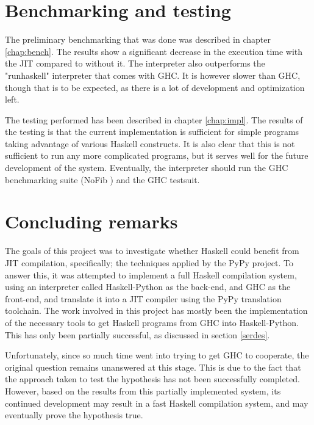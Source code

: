 \section{Benchmarking and testing}

\begin{comment}
Some simple benchmarking and testing was done. The benchmarking was done by
running the naive fibonacci program with $n=40$, the results can be seen in
table \ref{tab:benchmarks}.
It is clear that the interpreter must be optimized 
further if it is to compete with GHC. A significant increase in execution 
time with the JIT as opposed to without the JIT was observed. In addition,
for this benchmark, the interpreter with JIT was approximately $3.3$ times faster than
$runhaskell$ (an interpreter that comes with GHC).
\end{comment}

The preliminary benchmarking that was done was described in chapter \ref{chap:bench}. 
The results
show a significant decrease in the execution time with the JIT compared to without it.
The interpreter also outperforms the "runhaskell" interpreter that comes with GHC. It
is however slower than GHC, though that is to be expected, as there is a lot of 
development and optimization left.

The testing performed has been described in chapter \ref{chap:impl}. The results of the 
testing is that the current implementation is sufficient for simple programs taking 
advantage of various Haskell constructs. It is also clear that this is not sufficient
to run any more complicated programs, but it serves well for the future development of
the system. Eventually, the interpreter should run the GHC benchmarking suite 
(NoFib \cite{partain1992nofib}) and the GHC testsuit.

\section{Concluding remarks}


The goals of this project was to investigate whether Haskell could benefit from JIT 
compilation, specifically; the techniques applied by the PyPy project. 
To answer this, it was attempted to implement a full Haskell compilation
system, using an interpreter called Haskell-Python\cite{haskellpython} as the back-end,
and GHC as the front-end, and translate it into a JIT compiler using the PyPy translation
toolchain. The work involved in this project has mostly been the implementation of the necessary
tools to get Haskell programs from GHC into Haskell-Python. This has only been partially
successful, as discussed in section \ref{serdes}.

Unfortunately, since so much time went into trying to get GHC to cooperate, 
the original question remains unanswered at this stage. This is due to the fact that the
approach taken to test the hypothesis has not been successfully completed. However,
based on the results from this partially implemented system, its continued
development may result in a fast Haskell compilation system, and may eventually prove
the hypothesis true.

